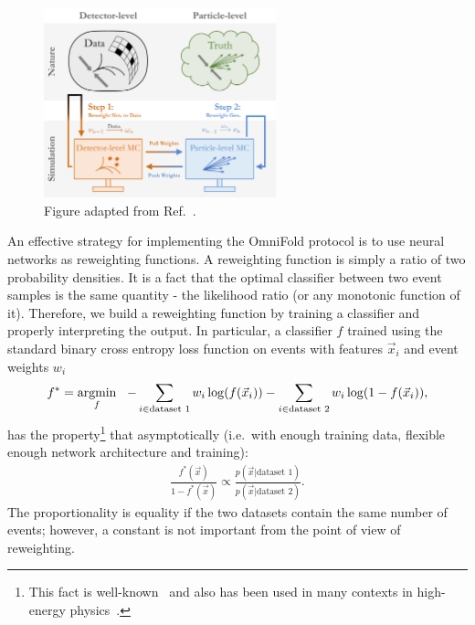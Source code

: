 \begin{figure}[h!]
\centering
\includegraphics[width=0.6\textwidth]{Figures/schematic.pdf}
\caption{Figure adapted from Ref.~\cite{1911.09107}.}
\label{fig:omnifoldschematic}
\end{figure}

An effective strategy for implementing the OmniFold protocol is to use neural networks as reweighting functions.  A reweighting function is simply a ratio of two probability densities.  It is a fact that the optimal classifier between two event samples is the same quantity - the likelihood ratio (or any monotonic function of it).  Therefore, we build a reweighting function by training a classifier and properly interpreting the output.
In particular, a classifier $f$ trained using the standard binary cross entropy loss function on events with features $\vec{x}_i$ and event weights $w_i$
%
\begin{align}
\label{eq:binarycrossentropy}
        f^*=\operatorname*{argmin}_f~~-\sum_{i\in\text{dataset 1}}w_i \log(f(\vec{x}_i)) -\sum_{i\in\text{dataset 2}} w_i\log(1-f(\vec{x}_i)),
\end{align}
%
has the property\footnote{This fact is well-known~\cite{hastie01statisticallearning,sugiyama_suzuki_kanamori_2012} and also has been used in many contexts in high-energy physics~\cite{2010.03569,1907.08209,Stoye:2018ovl,Hollingsworth:2020kjg,Brehmer:2018kdj,Brehmer:2018eca,Brehmer:2019xox,Brehmer:2018hga,Cranmer:2015bka,Badiali:2020wal,Andreassen:2020nkr,Andreassen:2019cjw,Fischer-ACAT2019}.} that asymptotically (i.e.\ with enough training data, flexible enough network architecture and training):
%
\begin{align}
\frac{f^*(\vec{x})}{1-f^*(\vec{x})}\propto \frac{p(\vec{x}|\text{dataset 1})}{p(\vec{x}|\text{dataset 2})}.
\end{align}
%
The proportionality is equality if the two datasets contain the same number of events; however, a constant is not important from the point of view of reweighting.

